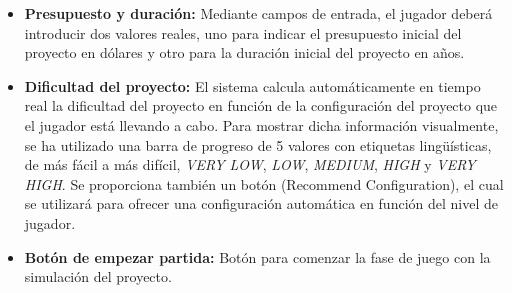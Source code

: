 \begin{itemize}
	\item \textbf{Presupuesto y duración:} Mediante campos de entrada, el jugador deberá introducir dos valores reales, uno para indicar el presupuesto inicial del proyecto en dólares y otro para la duración inicial del proyecto en años.
	\item \textbf{Dificultad del proyecto:} El sistema calcula automáticamente en tiempo real la dificultad del proyecto en función de la configuración del proyecto que el jugador está llevando a cabo. Para mostrar dicha información visualmente, se ha utilizado una barra de progreso de 5 valores con etiquetas lingüísticas, de más fácil a más difícil, \emph{VERY LOW}, \emph{LOW}, \emph{MEDIUM}, \emph{HIGH} y \emph{VERY HIGH}. Se proporciona también un botón (Recommend Configuration), el cual se utilizará para ofrecer una configuración automática en función del nivel de jugador.
	\item \textbf{Botón de empezar partida:} Botón para comenzar la fase de juego con la simulación del proyecto.
\end{itemize} 